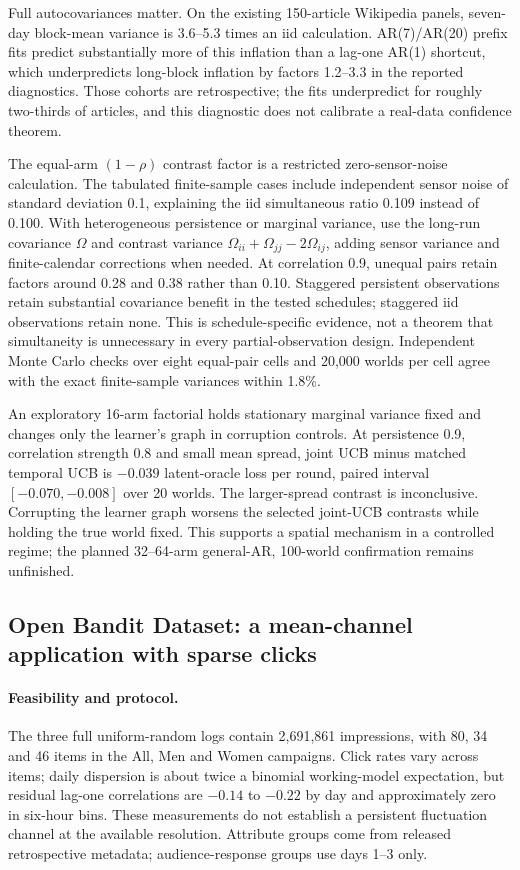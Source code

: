 Full autocovariances matter. On the existing 150-article Wikipedia panels, seven-day block-mean variance is 3.6--5.3 times an iid calculation. AR(7)/AR(20) prefix fits predict substantially more of this inflation than a lag-one AR(1) shortcut, which underpredicts long-block inflation by factors 1.2--3.3 in the reported diagnostics. Those cohorts are retrospective; the fits underpredict for roughly two-thirds of articles, and this diagnostic does not calibrate a real-data confidence theorem.



The equal-arm $(1-\rho)$ contrast factor is a restricted zero-sensor-noise calculation. The tabulated finite-sample cases include independent sensor noise of standard deviation 0.1, explaining the iid simultaneous ratio 0.109 instead of 0.100. With heterogeneous persistence or marginal variance, use the long-run covariance $\Omega$ and contrast variance $\Omega_{ii}+\Omega_{jj}-2\Omega_{ij}$, adding sensor variance and finite-calendar corrections when needed. At correlation 0.9, unequal pairs retain factors around 0.28 and 0.38 rather than 0.10. Staggered persistent observations retain substantial covariance benefit in the tested schedules; staggered iid observations retain none. This is schedule-specific evidence, not a theorem that simultaneity is unnecessary in every partial-observation design. Independent Monte Carlo checks over eight equal-pair cells and 20,000 worlds per cell agree with the exact finite-sample variances within 1.8\%.

An exploratory 16-arm factorial holds stationary marginal variance fixed and changes only the learner's graph in corruption controls. At persistence 0.9, correlation strength 0.8 and small mean spread, joint UCB minus matched temporal UCB is $-0.039$ latent-oracle loss per round, paired interval $[-0.070,-0.008]$ over 20 worlds. The larger-spread contrast is inconclusive. Corrupting the learner graph worsens the selected joint-UCB contrasts while holding the true world fixed. This supports a spatial mechanism in a controlled regime; the planned 32--64-arm general-AR, 100-world confirmation remains unfinished.

\subsection{Open Bandit Dataset: a mean-channel application with sparse clicks}

\paragraph{Feasibility and protocol.} The three full uniform-random logs contain 2,691,861 impressions, with 80, 34 and 46 items in the All, Men and Women campaigns. Click rates vary across items; daily dispersion is about twice a binomial working-model expectation, but residual lag-one correlations are $-0.14$ to $-0.22$ by day and approximately zero in six-hour bins. These measurements do not establish a persistent fluctuation channel at the available resolution. Attribute groups come from released retrospective metadata; audience-response groups use days 1--3 only.


